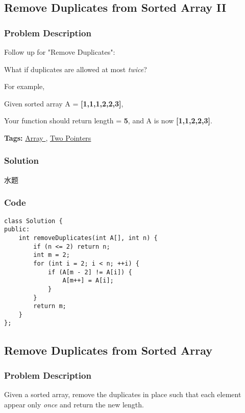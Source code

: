 \documentclass{article}
\begin{document}
\begin{CJK*}{UTF8}{gkai}
\subsection{ Remove Duplicates from Sorted Array II }
\label{ Remove Duplicates from Sorted Array II }

\subsubsection*{Problem Description}
Follow up for "Remove Duplicates":


What if duplicates are allowed at most \emph{twice}?

For example,


Given sorted array A = \textbf{[1,1,1,2,2,3]},

Your function should return length = \textbf{5}, and A is now \textbf{[1,1,2,2,3]}.


\textbf{Tags: }
\hyperref[ Array ]{ Array },  \hyperref[ Two Pointers ]{ Two Pointers }



\subsubsection*{Solution}
水题

\subsubsection*{Code}
\begin{lstlisting}
class Solution {
public:
    int removeDuplicates(int A[], int n) {
        if (n <= 2) return n;
        int m = 2;
        for (int i = 2; i < n; ++i) {
            if (A[m - 2] != A[i]) {
                A[m++] = A[i];
            }
        }
        return m;
    }
}; 
\end{lstlisting}


\subsection{ Remove Duplicates from Sorted Array }
\label{ Remove Duplicates from Sorted Array }

\subsubsection*{Problem Description}
Given a sorted array, remove the duplicates in place such that each element appear only \emph{once} and return the new length.


\end{CJK*}
\end{document}
